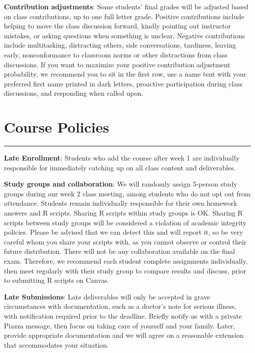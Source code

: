 \documentclass[12pt]{article}
\begin{document}
\textbf{Contribution adjustments}: Some students' final grades will be adjusted based on class contributions, up to one full letter grade. Positive contributions include helping to move the class discussion forward, kindly pointing out instructor mistakes, or asking questions when something is unclear. Negative contributions include multitasking, distracting others, side conversations, tardiness, leaving early, nonconformance to classroom norms or other distractions from class discussions. If you want to maximize your positive contribution adjustment probability, we recommend you to sit in the first row, use a name tent with your preferred first name printed in dark letters, proactive participation during class discussions, and responding when called upon.

\vspace{.5cm}

\section*{Course Policies}

\medskip
\hrule
\medskip

\textbf{Late Enrollment}: Students who add the course after week 1 are individually responsible for immediately catching up on all class content and deliverables. 

\textbf{Study groups and collaboration}: We will randomly assign 5-person study groups during our week 2 class meeting, among students who do not opt out from attendance. %
Students remain individually responsible for their own homework answers and R scripts. Sharing R scripts within study groups is OK. Sharing R scripts between study groups will be considered a violation of academic integrity policies. Please be advised that we can detect this and will report it, so be very careful whom you share your scripts with, as you cannot observe or control their future distribution. There will not be any collaboration available on the final exam. Therefore, we recommend each student complete assignments individually, then meet regularly with their study group to compare results and discuss, prior to submitting R scripts on Canvas.

\textbf{Late Submissions}: Late deliverables will only be accepted in grave circumstances with documentation, such as a doctor's note for serious illness, with notification required prior to the deadline. Briefly notify us with a private Piazza message, then focus on taking care of yourself and your family. Later, provide appropriate documentation and we will agree on a reasonable extension that accommodates your situation. 
\end{document}
